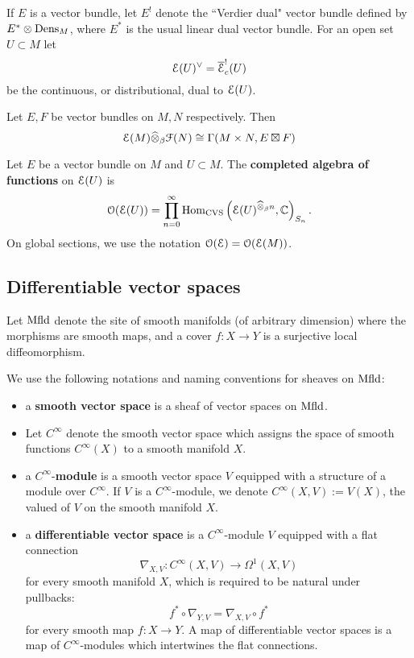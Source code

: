 \documentclass[10pt, oneside]{article}
\begin{document}
If $E$ is a vector bundle, let $E^!$ denote the ``Verdier dual" vector bundle defined by $E^* \otimes {\rm Dens}_M$, where $E^*$ is the usual linear dual vector bundle. 
For an open set $U \subset M$ let 
\[
\mathcal E(U)^\vee = \overline{\mathcal E}^!_c(U)
\]
be the continuous, or distributional, dual to $\mathcal E(U)$. 


\begin{prop}
Let $E,F$ be vector bundles on $M,N$ respectively.
Then
\[
\mathcal E(M) \widehat{\otimes}_\beta \mathcal F(N) \cong \Gamma(M \times N, E \boxtimes F)
\]
\end{prop}

\begin{definition}\label{dfn: fnl}
Let $E$ be a vector bundle on $M$ and $U \subset M$.
The {\bf completed algebra of functions} on $\mathcal E(U)$ is
\[
\mathcal O(\mathcal E(U)) = \prod_{n = 0}^\infty {\rm Hom}_{\rm CVS} \left(\mathcal E(U)^{\widehat{\otimes}_\beta n}, \mathbb C\right)_{S_n} .
\]
On global sections, we use the notation $\mathcal O(\mathcal E) = \mathcal O(\mathcal E(M))$. 
\end{definition}

\subsection{Differentiable vector spaces}
\def\Mfld{{\rm Mfld}}

Let $\Mfld$ denote the site of smooth manifolds (of arbitrary dimension) where the morphisms are smooth maps, and a cover $f : X \to Y$ is a surjective local diffeomorphism.  

\begin{definition} 
We use the following notations and naming conventions for sheaves on $\Mfld$:
\begin{itemize}
\item a {\bf smooth vector space} is a sheaf of vector spaces on $\Mfld$.
\item Let $C^\infty$ denote the smooth vector space which assigns the space of smooth functions $C^\infty(X)$ to a smooth manifold $X$.
\item a $C^\infty$-{\bf module} is a smooth vector space $V$ equipped with a structure of a module over $C^\infty$. 
If $V$ is a $C^\infty$-module, we denote $C^\infty(X, V) := V(X)$, the valued of $V$ on the smooth manifold $X$.
\item a {\bf differentiable vector space} is a $C^\infty$-module $V$ equipped with a flat connection
\[
\nabla_{X,V} : C^\infty(X, V) \to \Omega^1(X, V)
\]
for every smooth manifold $X$, which is required to be natural under pullbacks:
\[
f^* \circ \nabla_{Y,V} = \nabla_{X,V} \circ f^*
\]
for every smooth map $f : X \to Y$. 
A map of differentiable vector spaces is a map of $C^\infty$-modules which intertwines the flat connections. 
\end{itemize}
\end{definition}
\end{document}
